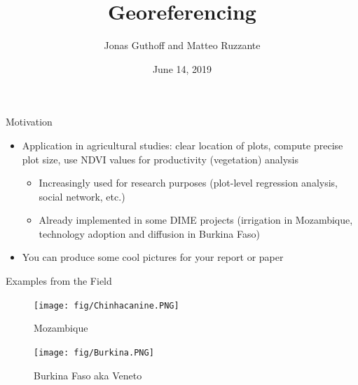 \documentclass[aspectratio=169]{beamer}
\title{Georeferencing}
\date{June 14, 2019}
\author{Jonas Guthoff and Matteo Ruzzante} %
\institute{Development Impact Evaluation (DIME) \newline The World Bank }
\begin{document}
	
{
\maketitle
}

\begin{frame}{Motivation}

\begin{itemize}
    \setlength\itemsep{1.5em}
    \item Application in \alert{agricultural studies}: clear location of plots, compute precise plot size, use NDVI values for productivity (vegetation) analysis
    \begin{itemize}
        \vspace{0.75em}
        \setlength\itemsep{0.75em}
        \item Increasingly used for research purposes (plot-level regression analysis, social network, etc.)
        \item Already implemented in some DIME projects (irrigation in Mozambique, technology adoption and diffusion in Burkina Faso)
    \end{itemize}

    \item You can produce some cool pictures for your report or paper \Smiley{}
\end{itemize}

\end{frame}

\begin{frame}{Examples from the Field}
    
    \begin{minipage}{0.5\textwidth}
        \begin{figure}[h!]
            \centering
            \texttt{[image: fig/Chinhacanine.PNG]}
            \caption{Mozambique}
            \label{fig:MOZ}
        \end{figure}
    \end{minipage}%
    \begin{minipage}{0.5\textwidth}
        \begin{figure}[h!]
            \centering
            \texttt{[image: fig/Burkina.PNG]}
            \caption{Burkina Faso aka Veneto}
            \label{fig:Burkina}
        \end{figure}
    \end{minipage}
    
\end{frame}
\end{document}
